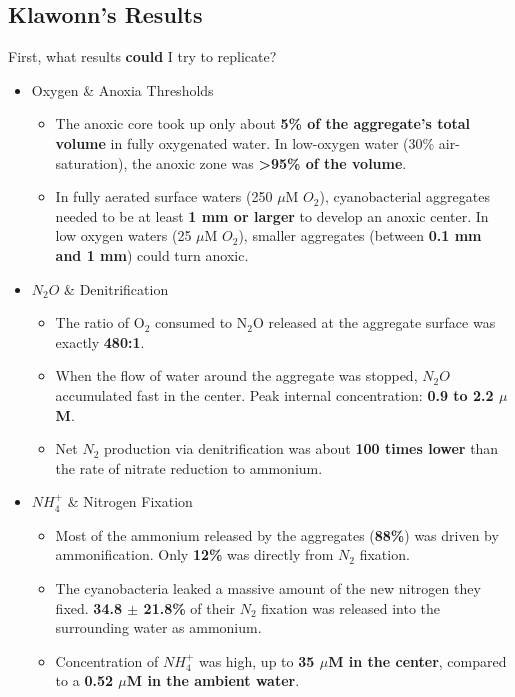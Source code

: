 \documentclass{article}
\begin{document}
\subsection{Klawonn's Results}
First, what results \textbf{could} I try to replicate?
\begin{itemize}
    \item Oxygen \& Anoxia Thresholds
    \begin{itemize}
        \item The anoxic core took up only about \textbf{5\% of the aggregate's total volume} in fully oxygenated water. In low-oxygen water (30\% air-saturation), the anoxic zone was \textbf{>95\% of the volume}.
        \item In fully aerated surface waters (250 $\mu$M $O_2$), cyanobacterial aggregates needed to be at least \textbf{1 mm or larger} to develop an anoxic center. In low oxygen waters (25 $\mu$M $O_2$), smaller aggregates (between \textbf{0.1 mm and 1 mm}) could turn anoxic.
    \end{itemize}
    
    \item $N_2O$ \& Denitrification
    \begin{itemize}
        \item The ratio of O$_2$ consumed to N$_2$O released at the aggregate surface was exactly \textbf{480:1}.
        \item When the flow of water around the aggregate was stopped, $N_2O$ accumulated fast in the center. Peak internal concentration: \textbf{0.9 to 2.2 $\mu$M}.
        \item Net $N_2$ production via denitrification was about \textbf{100 times lower} than the rate of nitrate reduction to ammonium.
    \end{itemize}
    
    \item $NH_4^+$ \& Nitrogen Fixation
    \begin{itemize}
        \item Most of the ammonium released by the aggregates (\textbf{88\%}) was driven by ammonification. Only \textbf{12\%} was directly from $N_2$ fixation.
        \item The cyanobacteria leaked a massive amount of the new nitrogen they fixed. \textbf{34.8 $\pm$ 21.8\%} of their $N_2$ fixation was released into the surrounding water as ammonium.
        \item Concentration of $NH_4^+$ was high, up to \textbf{35 $\mu$M in the center}, compared to a \textbf{0.52 $\mu$M in the ambient water}.
    \end{itemize}
\end{itemize}
\end{document}
